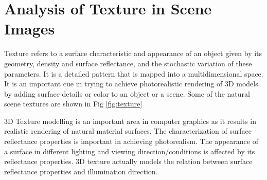 \label{sec:intro}
\section{Analysis of Texture in Scene Images}

Texture refers to a surface characteristic and appearance of an object given by
its geometry, density and surface reflectance, and the stochastic variation of
these parameters.
It is a detailed pattern that is mapped into a multidimensional space.
It is an important cue in trying to achieve photorealistic
rendering of 3D models by adding surface details or color to an object or a
scene. Some of the natural scene textures are shown in Fig \ref{fig:texture}

3D Texture modelling is an important area in computer graphics as it results in realistic rendering
of natural material surfaces. The characterization of surface reflectance properties is important in
achieving photorealism. The appearance of a surface in different lighting and viewing direction/conditions 
is affected by its reflectance properties. 3D texture actually models the relation
between surface reflectance properties and illumination direction.

